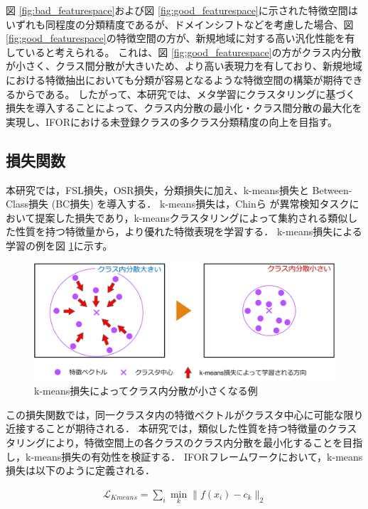 \documentclass[a4paper,11pt,nomag]{jsreport}
\begin{document}
% 
図 \ref{fig:bad_featurespace}および図 \ref{fig:good_featurespace}に示された特徴空間はいずれも同程度の分類精度であるが、ドメインシフトなどを考慮した場合、図 \ref{fig:good_featurespace}の特徴空間の方が、新規地域に対する高い汎化性能を有していると考えられる。
これは、図 \ref{fig:good_featurespace}の方がクラス内分散が小さく、クラス間分散が大きいため、より高い表現力を有しており、新規地域における特徴抽出においても分類が容易となるような特徴空間の構築が期待できるからである。
したがって、本研究では、メタ学習にクラスタリングに基づく損失を導入することによって、クラス内分散の最小化・クラス間分散の最大化を実現し、IFORにおける未登録クラスの多クラス分類精度の向上を目指す。

\subsection{損失関数}

本研究では，FSL損失，OSR損失，分類損失に加え、k-means損失と Between-Class損失 (BC損失) を導入する．
k-means損失は，Chinら \cite{k-means}が異常検知タスクにおいて提案した損失であり，k-meansクラスタリングによって集約される類似した性質を持つ特徴量から，より優れた特徴表現を学習する．
k-means損失による学習の例を図 \ref{fig:kmeans_loss}に示す。
% 
\begin{figure}[tbp]
  \centering
  \includegraphics[width=\linewidth, keepaspectratio]{image/kmeans_loss.png}
  \caption{k-means損失によってクラス内分散が小さくなる例}
  \label{fig:kmeans_loss}
\end{figure}
% 
この損失関数では，同一クラスタ内の特徴ベクトルがクラスタ中心に可能な限り近接することが期待される．
本研究では，類似した性質を持つ特徴量のクラスタリングにより，特徴空間上の各クラスのクラス内分散を最小化することを目指し，k-means損失の有効性を検証する．
IFORフレームワークにおいて，k-means損失は以下のように定義される．

\begin{align}
\mathcal{L}_{Kmeans} = \sum_i{\min_k \lVert f(x_i)-c_k \rVert_2}
\end{align}
\end{document}
